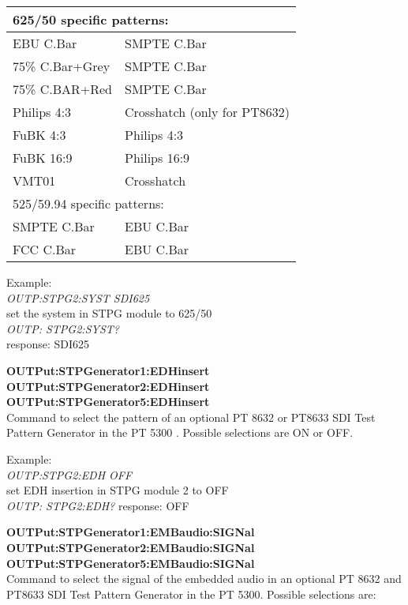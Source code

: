 \begin{tabular}{|l@{$\rightarrow$}l|}
\hline
\multicolumn{2}{|l|}{625/50 specific patterns:} \\ \hline
EBU C.Bar 				& SMPTE C.Bar \\ \hline
75\% C.Bar+Grey 	& SMPTE C.Bar \\ \hline
75\% C.BAR+Red 		& SMPTE C.Bar \\ \hline
Philips 4:3 			& Crosshatch (only for PT8632) \\ \hline
FuBK 4:3 					& Philips 4:3 \\ \hline
FuBK 16:9 				& Philips 16:9 \\ \hline
VMT01 						& Crosshatch \\ \hline
\multicolumn{2}{|l|}{525/59.94 specific patterns:} \\ \hline
SMPTE C.Bar 			& EBU C.Bar \\ \hline
FCC C.Bar 				& EBU C.Bar \\ \hline
\end{tabular}

Example:\\
\textit{OUTP:STPG2:SYST SDI625}\\
set the system in STPG module to 625/50\\
\textit{OUTP: STPG2:SYST?}\\ response: SDI625

\textbf{OUTPut:STPGenerator1:EDHinsert}\\
\textbf{OUTPut:STPGenerator2:EDHinsert}\\
\textbf{OUTPut:STPGenerator5:EDHinsert}\\
Command to select the pattern of an optional PT 8632 or PT8633 SDI Test Pattern Generator in the PT 5300 . Possible selections are ON or OFF.

Example:\\
\textit{OUTP:STPG2:EDH OFF}\\
set EDH insertion in STPG module 2 to OFF\\
\textit{OUTP: STPG2:EDH?}
response: OFF

\textbf{OUTPut:STPGenerator1:EMBaudio:SIGNal}\\
\textbf{OUTPut:STPGenerator2:EMBaudio:SIGNal}\\
\textbf{OUTPut:STPGenerator5:EMBaudio:SIGNal}\\
Command to select the signal of the embedded audio in an optional PT 8632 and PT8633 SDI Test Pattern Generator in the PT 5300. Possible selections are:

